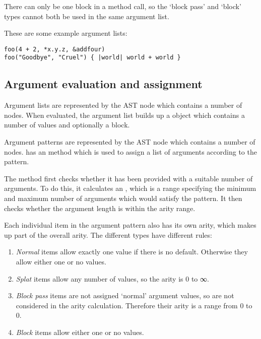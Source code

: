 There can only be one block in a method call, so the `block pass' and `block' types cannot both be used in the same argument list.

These are some example argument lists:

\begin{lstlisting}
foo(4 + 2, *x.y.z, &addfour)
foo("Goodbye", "Cruel") { |world| world + world }
\end{lstlisting}

\subsection{Argument evaluation and assignment}

Argument lists are represented by the  AST node which contains a number of \-\- nodes. When evaluated, the argument list builds up a  object which contains a number of values and optionally a block.

Argument patterns are represented by the  AST node which contains a number of \-\- nodes.  has an  method which is used to assign a list of arguments according to the pattern.

The  method first checks whether it has been provided with a suitable number of arguments. To do this, it calculates an , which is a range specifying the minimum and maximum number of arguments which would satisfy the pattern. It then checks whether the argument length is within the arity range.

Each individual item in the argument pattern also has its own arity, which makes up part of the overall arity. The different types have different rules:

\begin{enumerate}
  \item \textit{Normal} items allow exactly one value if there is no default. Otherwise they allow either one or no values.
  \item \textit{Splat} items allow any number of values, so the arity is 0 to ∞.
  \item \textit{Block pass} items are not assigned `normal' argument values, so are not considered in the arity calculation. Therefore their arity is a range from 0 to 0.
  \item \textit{Block} items allow either one or no values.
\end{enumerate}

